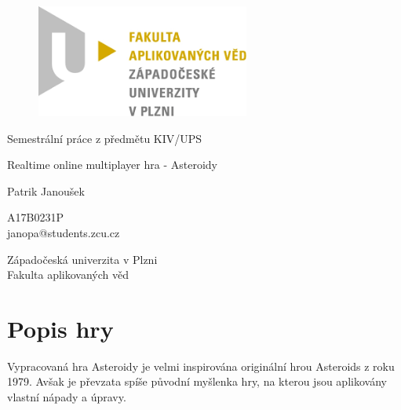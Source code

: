 \documentclass[12pt, a4paper]{article}
\begin{document}
    \begin{titlepage}

        \centering

        \vspace*{\baselineskip}

        \begin{figure}[H]
            \centering
            \includegraphics[width=7cm]{fav-logo.png}
        \end{figure}

        \vspace*{1\baselineskip}
        {\sc Semestrální práce z předmětu KIV/UPS}
        \vspace*{1\baselineskip}

        \vspace{0.75\baselineskip}

        {\LARGE\sc Realtime online multiplayer hra - Asteroidy \\}

        \vspace{4\baselineskip}

        {\sc\Large Patrik Janoušek \\}

        \vspace{0.5\baselineskip}

        {A17B0231P}\\
        {janopa@students.zcu.cz}

        \vfill

        {\sc Západočeská univerzita v Plzni\\
        Fakulta aplikovaných věd}


    \end{titlepage}


    \tableofcontents
    \pagebreak

    \newpage

    \section{Popis hry}
    Vypracovaná hra Asteroidy je velmi inspirována originální hrou Asteroids z roku 1979.
    Avšak je převzata spíše původní myšlenka hry, na kterou jsou aplikovány vlastní nápady a úpravy.
\end{document}
